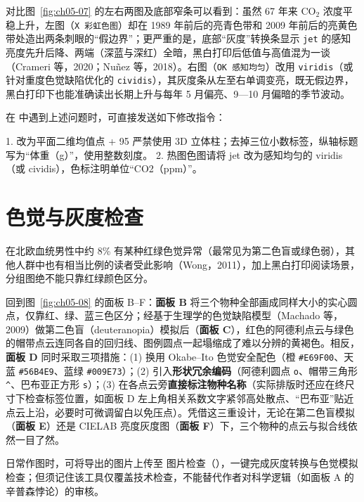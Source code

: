 对比图~\ref{fig:ch05-07} 的左右两图及底部窄条可以看到：虽然 67 年来 $\text{CO}_2$ 浓度平稳上升，左图（\texttt{X 彩虹色图}）却在 1989 年前后的亮青色带和 2009 年前后的亮黄色带处造出两条刺眼的“假边界”；更严重的是，底部“灰度”转换条显示 \texttt{jet} 的感知亮度先升后降、两端（深蓝与深红）全暗，黑白打印后低值与高值混为一谈（Crameri 等，2020；Nuñez 等，2018）。右图（\texttt{OK 感知均匀}）改用 \texttt{viridis}（或针对重度色觉缺陷优化的 \texttt{cividis}），其灰度条从左至右单调变亮，既无假边界，黑白打印下也能准确读出长期上升与每年 5 月偏亮、9—10 月偏暗的季节波动。

在  中遇到上述问题时，可直接发送如下修改指令：

\begin{Prompt}
1. 改为平面二维均值点 + 95%
   严禁使用 3D 立体柱；去掉三位小数标签，纵轴标题写为“体重（g）”，使用整数刻度。
2. 热图色图请将 jet 改为感知均匀的 viridis（或 cividis），色标注明单位“CO2（ppm）”。
\end{Prompt}

\section{色觉与灰度检查}

在北欧血统男性中约 8\% 有某种红绿色觉异常（最常见为第二色盲或绿色弱），其他人群中也有相当比例的读者受此影响（Wong，2011），加上黑白打印阅读场景，分组图绝不能只靠红绿颜色区分。

回到图~\ref{fig:ch05-08} 的面板 B–F：\textbf{面板 B} 将三个物种全部画成同样大小的实心圆点，仅靠红、绿、蓝三色区分；经基于生理学的色觉缺陷模型（Machado 等，2009）做第二色盲（deuteranopia）模拟后（\textbf{面板 C}），红色的阿德利点云与绿色的帽带点云连同各自的回归线、图例圆点一起塌缩成了难以分辨的黄褐色。相反，\textbf{面板 D} 同时采取三项措施：(1) 换用 Okabe–Ito 色觉安全配色（橙 \texttt{\#E69F00}、天蓝 \texttt{\#56B4E9}、蓝绿 \texttt{\#009E73}）；(2) 引入\textbf{形状冗余编码}（阿德利圆点 \texttt{o}、帽带三角形 \texttt{\^{}}、巴布亚正方形 \texttt{s}）；(3) 在各点云旁\textbf{直接标注物种名称}（实际排版时还应在终尺寸下检查标签位置，如面板 D 左上角相关系数文字紧邻高处散点、“巴布亚”贴近点云上沿，必要时可微调留白以免压点）。凭借这三重设计，无论在第二色盲模拟（\textbf{面板 E}）还是 CIELAB 亮度灰度图（\textbf{面板 F}）下，三个物种的点云与拟合线依然一目了然。

日常作图时，可将导出的图片上传至 \scidraw{} 图片检查（），一键完成灰度转换与色觉模拟检查；但须记住该工具仅覆盖技术检查，不能替代作者对科学逻辑（如面板 A 的辛普森悖论）的审核。

